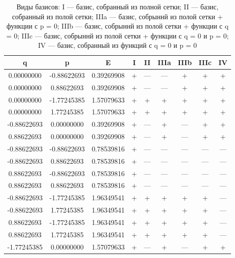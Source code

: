 \documentclass[a4paper,14pt]{extarticle}
\begin{document}
\begin{landscape}

\begin{table}[H]
\centering
\caption{Виды базисов: I --- базис, собранный из полной сетки; %
		       II --- базис, собранный из полой сетки; %
		       IIIa --- базис, собрыннй из полой сетки + функции с p = 0; %
		       IIIb --- базис, собрыннй из полой сетки + функции с q = 0; %
		       IIIc --- базис, собрыннй из полой сетки + функции с q = 0 и p = 0; %
		       IV --- базис, собранный из функций с q = 0 и p = 0}
\begin{tabular}{|c|c|c|*{6}{c}|}
\hline
 q          &  p          & E          & I & II  & IIIa & IIIb & IIIc & IV \\
\hline                                                                       
 0.00000000 & -0.88622693 & 0.39269908 & + & --- & ---  & +    & +    & +    \\ 
 0.00000000 &  0.88622693 & 0.39269908 & + & --- & ---  & +    & +    & +    \\
 0.00000000 & -1.77245385 & 1.57079633 & + & +   & +    & +    & +    & +    \\
 0.00000000 &  1.77245385 & 1.57079633 & + & +   & +    & +    & +    & +    \\
-0.88622693 &  0.00000000 & 0.39269908 & + & --- & +    & ---  & +    & +    \\
 0.88622693 &  0.00000000 & 0.39269908 & + & --- & +    & ---  & +    & +    \\
-0.88622693 & -0.88622693 & 0.78539816 & + & --- & ---  & ---  & ---  & ---  \\
-0.88622693 &  0.88622693 & 0.78539816 & + & --- & ---  & ---  & ---  & ---  \\
 0.88622693 & -0.88622693 & 0.78539816 & + & --- & ---  & ---  & ---  & ---  \\
 0.88622693 &  0.88622693 & 0.78539816 & + & --- & ---  & ---  & ---  & ---  \\
-0.88622693 & -1.77245385 & 1.96349541 & + & +   & +    & +    & +    & ---  \\
-0.88622693 &  1.77245385 & 1.96349541 & + & +   & +    & +    & +    & ---  \\
 0.88622693 & -1.77245385 & 1.96349541 & + & +   & +    & +    & +    & ---  \\
 0.88622693 &  1.77245385 & 1.96349541 & + & +   & +    & +    & +    & ---  \\
-1.77245385 &  0.00000000 & 1.57079633 & + & --- & +    & ---  & +    & +    \\

\end{tabular}
\end{table}
\end{landscape}
\end{document}
